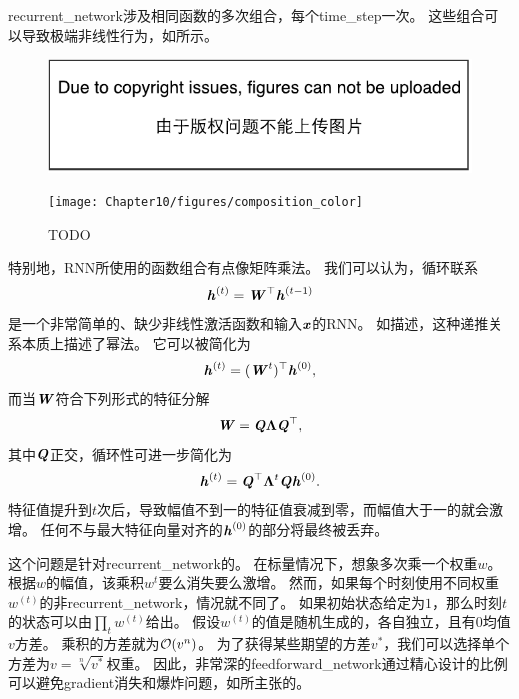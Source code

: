 
\gls{recurrent_network}涉及相同函数的多次组合，每个\gls{time_step}一次。
这些组合可以导致极端非线性行为，如所示。
\begin{figure}[!htb]
\ifOpenSource
\centerline{\includegraphics{figure.pdf}}
\else
\centerline{\texttt{[image: Chapter10/figures/composition\_color]}}
\fi
\caption{TODO}
\label{fig:chap10_composition_color}
\end{figure}

特别地，\gls{RNN}所使用的函数组合有点像矩阵乘法。
我们可以认为，循环联系
\begin{align}
 \boldsymbol{\mathit{h}}^{(t)} = \boldsymbol{\mathit{W}}^\top \boldsymbol{\mathit{h}}^{(t-1)}
\end{align}
是一个非常简单的、缺少非线性激活函数和输入$\boldsymbol{\mathit{x}}$的\gls{RNN}。
如描述，这种递推关系本质上描述了幂法。
它可以被简化为
\begin{align}
 \boldsymbol{\mathit{h}}^{(t)} = (\boldsymbol{\mathit{W}}^t)^\top \boldsymbol{\mathit{h}}^{(0)},
\end{align}
而当$\boldsymbol{\mathit{W}}$符合下列形式的特征分解
\begin{align}
 \boldsymbol{\mathit{W}} = \boldsymbol{\mathit{Q}} \boldsymbol{\Lambda} \boldsymbol{\mathit{Q}}^\top,
\end{align}
其中$\boldsymbol{\mathit{Q}}$正交，循环性可进一步简化为
\begin{align}
 \boldsymbol{\mathit{h}}^{(t)} = \boldsymbol{\mathit{Q}}^\top \boldsymbol{\Lambda}^t \boldsymbol{\mathit{Q}} \boldsymbol{\mathit{h}}^{(0)}.
\end{align}
特征值提升到$t$次后，导致幅值不到一的特征值衰减到零，而幅值大于一的就会激增。
任何不与最大特征向量对齐的$\boldsymbol{\mathit{h}}^{(0)}$的部分将最终被丢弃。


这个问题是针对\gls{recurrent_network}的。
在标量情况下，想象多次乘一个权重$w$。
根据$w$的幅值，该乘积$w^t$要么消失要么激增。
然而，如果每个时刻使用不同权重$w^{(t)}$的非\gls{recurrent_network}，情况就不同了。
如果初始状态给定为$1$，那么时刻$t$的状态可以由$\prod_t w^{(t)}$给出。
假设$w^{(t)}$的值是随机生成的，各自独立，且有$0$均值$v$方差。
乘积的方差就为$\mathcal{O}(v^n)$。
为了获得某些期望的方差$v^*$，我们可以选择单个方差为$v=\sqrt[n]{v^*}$权重。
因此，非常深的\gls{feedforward_network}通过精心设计的比例可以避免\gls{gradient}消失和爆炸问题，如\cite{Sussillo14}所主张的。


